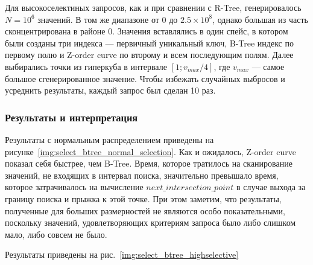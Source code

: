 Для высокоселектиных запросов, как и при сравнении с R-Tree, генерировалось $N = 10^6$ значений.
В том же диапазоне от $0$ до $2.5 \times 10^8$, однако большая из часть сконцентрирована в районе 0.
Значения вставлялись в один спейс, в котором были созданы три индекса ---
первичный уникальный ключ, B-Tree индекс по первому полю и Z-order curve по второму и всем последующим полям.
Далее выбирались точки из гиперкуба в интервале $[1; v_{max}/4]$, где $v_{max}$ --- самое большое
сгенерированное значение.
Чтобы избежать случайных выбросов и усреднить результаты, каждый запрос был сделан 10 раз.

\subsubsection{Результаты и интерпретация}
Результаты с нормальным распределением приведены на рисунке~\ref{img:select_btree_normal_selection}.
Как и ожидалось, Z-order curve показал себя быстрее, чем B-Tree.
Время, которое тратилось на сканирование значений, не входящих в интервал поиска,
значительно превышало время, которое затрачивалось на вычисление $next\_intersection\_point$
в случае выхода за границу поиска и прыжка к этой точке.
При этом заметим, что результаты, полученные для больших размерностей не являются особо показательными,
поскольку значений, удовлетворяющих критериям запроса было либо слишком мало,
либо совсем не было.

Результаты приведены на рис.~\ref{img:select_btree_highselective}
\begin{figure}
	\centering
\end{figure}

